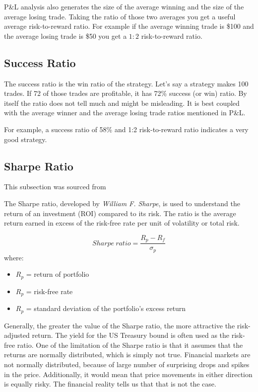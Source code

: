 P\&L analysis also generates the size of the average winning and the size of the average losing trade. Taking the ratio of those two averages you get a useful average risk-to-reward ratio. For example if the average winning trade is \$100 and the average losing trade is \$50 you get a $1:2$ risk-to-reward ratio.

\subsection*{Success Ratio}
The success ratio is the win ratio of the strategy. Let's say a strategy makes 100 trades. If 72 of those trades are profitable, it has 72\% success (or win) ratio. By itself the ratio does not tell much and might be misleading. It is best coupled with the average winner and the average losing trade ratios mentioned in P\&L.

For example, a success ratio of 58\% and 1:2 risk-to-reward ratio indicates a very good strategy.

\subsection*{Sharpe Ratio}
This subsection was sourced from~\cite{investopedia:sharpe-ratio}

The Sharpe ratio, developed by \emph{William F. Sharpe}, is used to understand the return of an investment (ROI) compared to its risk. The ratio is the average return earned in excess of the risk-free rate per unit of volatility or total risk.

$$Sharpe\ ratio = \frac{R_p - R_f}{\sigma _p}$$
where:
\begin{itemize}
    \item $R_p$ = return of portfolio
    \item $R_p$ = risk-free rate
    \item $R_p$ = standard deviation of the portfolio's excess return
\end{itemize}

Generally, the greater the value of the Sharpe ratio, the more attractive the risk-adjusted return. The yield for the US Treasury bound is often used as the risk-free ratio. One of the limitation of the Sharpe ratio is that it assumes that the returns are normally distributed, which is simply not true. Financial markets are not normally distributed, because of large number of surprising drops and spikes in the price. Additionally, it would mean that price movements in either direction is equally risky. The financial reality tells us that that is not the case.

